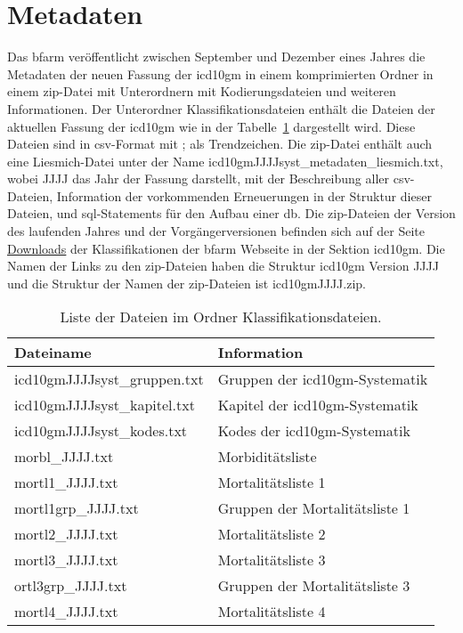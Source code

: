 \section{Metadaten} \label{sec:metadata}

Das \ac{bfarm} veröffentlicht zwischen September und Dezember eines Jahres die Metadaten der neuen Fassung der \ac{icd10gm} in einem komprimierten Ordner in einem \ac{zip}-Datei mit Unterordnern  mit Kodierungsdateien und weiteren Informationen. Der Unterordner Klassifikationsdateien enthält die Dateien der aktuellen Fassung der \ac{icd10gm} wie in der Tabelle~\ref{tab:classfiles} dargestellt wird. Diese Dateien sind in \ac{csv}-Format mit \glqq ;\grqq{} als Trendzeichen. Die \ac{zip}-Datei enthält auch eine Liesmich-Datei unter der Name \textsf{icd10gmJJJJsyst\_metadaten\_liesmich.txt}, wobei \textsf{JJJJ} das Jahr der Fassung darstellt, mit der Beschreibung aller \ac{csv}-Dateien, Information der vorkommenden Erneuerungen in der Struktur dieser Dateien, und \ac{sql}-Statements für den Aufbau einer \ac{db}. Die \ac{zip}-Dateien der Version des laufenden Jahres und der Vorgängerversionen befinden sich auf der Seite \href{https://www.dimdi.de/dynamic/de/klassifikationen/downloads/}{Downloads} der Klassifikationen der \ac{bfarm} Webseite in der Sektion \ac{icd10gm}. Die Namen der Links zu den \ac{zip}-Dateien haben die Struktur \textsf{\ac{icd10gm} Version JJJJ} und die Struktur der Namen der \ac{zip}-Dateien ist \textsf{\ac{icd10gm}JJJJ.zip}.


\begin{table}[ht]
	\centering
	\small
	\caption{Liste der Dateien im Ordner Klassifikationsdateien.}
	\label{tab:classfiles}
	\begin{tabular}{|l|l|}
		\hline
		\rowcolor{lightgray} Dateiname & Information \\
		\hline 
		\textsf{icd10gmJJJJsyst\_gruppen.txt} &  Gruppen der \ac{icd10gm}-Systematik \\ \hline
		\textsf{icd10gmJJJJsyst\_kapitel.txt} & Kapitel der \ac{icd10gm}-Systematik \\ \hline
		\textsf{icd10gmJJJJsyst\_kodes.txt} & Kodes der \ac{icd10gm}-Systematik \\ \hline
		\textsf{morbl\_JJJJ.txt} & Morbiditätsliste  \\ \hline
		\textsf{mortl1\_JJJJ.txt} & Mortalitätsliste 1 \\ \hline
		\textsf{mortl1grp\_JJJJ.txt} & Gruppen der Mortalitätsliste 1 \\ \hline
		\textsf{mortl2\_JJJJ.txt} & Mortalitätsliste 2 \\ \hline
		\textsf{mortl3\_JJJJ.txt} & Mortalitätsliste 3 \\ \hline
		\textsf{ortl3grp\_JJJJ.txt} & Gruppen der Mortalitätsliste 3 \\ \hline
		\textsf{mortl4\_JJJJ.txt} & Mortalitätsliste 4 \\ \hline
	\end{tabular}
\end{table}

